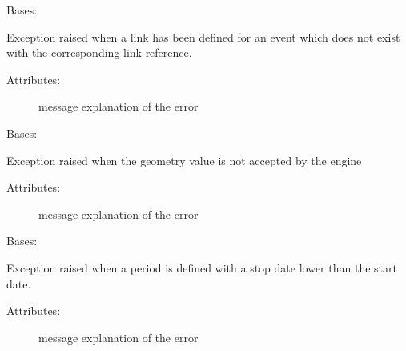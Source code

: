 
\begin{fulllineitems}
\label{\detokenize{eboa.engine:eboa.engine.errors.UndefinedEventLink}}
Bases: {\hyperref[\detokenize{eboa.engine:eboa.engine.errors.Error}]{}}

Exception raised when a link has been defined for an event which does not exist with the corresponding link reference.
\begin{description}
\item[{Attributes:}] \leavevmode
message \textendash{} explanation of the error

\end{description}

\end{fulllineitems}


\begin{fulllineitems}
\label{\detokenize{eboa.engine:eboa.engine.errors.WrongGeometry}}
Bases: {\hyperref[\detokenize{eboa.engine:eboa.engine.errors.Error}]{}}

Exception raised when the geometry value is not accepted by the engine
\begin{description}
\item[{Attributes:}] \leavevmode
message \textendash{} explanation of the error

\end{description}

\end{fulllineitems}


\begin{fulllineitems}
\label{\detokenize{eboa.engine:eboa.engine.errors.WrongPeriod}}
Bases: {\hyperref[\detokenize{eboa.engine:eboa.engine.errors.Error}]{}}

Exception raised when a period is defined with a stop date lower than the start date.
\begin{description}
\item[{Attributes:}] \leavevmode
message \textendash{} explanation of the error

\end{description}

\end{fulllineitems}

